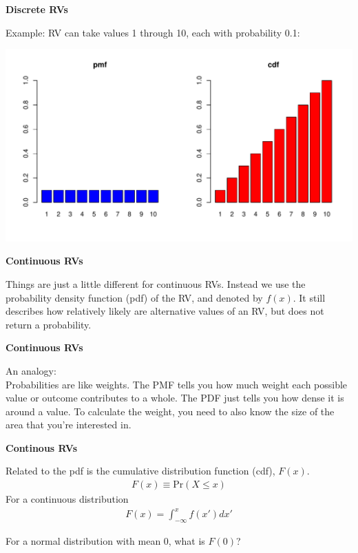 \documentclass[12pt,xcolor=svgnames]{beamer}
\newcommand{\bl}{\color{blue}}
\newcommand{\theme}{\color{FireBrick}}
\newcommand{\sk}{\vspace{.4cm}}
\newcommand{\nsk}{\vspace{-.4cm}}
\newcommand{\chap}[1]{{\theme \Large \bf #1} \sk}
\newcommand{\pr}{\text{Pr}}
\begin{document}
\begin{frame}
\chap{Discrete RVs}

Example: RV can take values 1 through 10, each with probability 0.1:

\begin{center}
\includegraphics[scale=0.4,trim=10 20 0 10]{discreteRVs}
\end{center}

\end{frame}



\begin{frame}
\chap{Continuous RVs}

Things are just a little different for continuous RVs. Instead we use the {\bl probability density function} (pdf) of the RV, and denoted by $f(x)$. It still describes how relatively likely are alternative values of an RV, but does not return a probability.

\end{frame}

\begin{frame}
\chap{Continuous RVs}

An analogy:\\
\sk
Probabilities are like {\bl weights}. The PMF tells you how much weight each possible value or outcome contributes to a whole. The PDF just tells you how dense it is around a value. To calculate the weight, you need to also know the size of the area that you're interested in. 

\end{frame}


\begin{frame}
\chap{Continous RVs}

Related to the pdf is the {\bl cumulative distribution function} (cdf), $F(x)$. 
\begin{align*}
F(x) \equiv \pr(X \leq x)
\end{align*}
For a continuous distribution
\nsk
\begin{align*}
F(x)= \int_{-\infty}^x f(x')dx'
\end{align*}

For a normal distribution with mean 0, what is $F(0)$? 

\end{frame}
\end{document}
